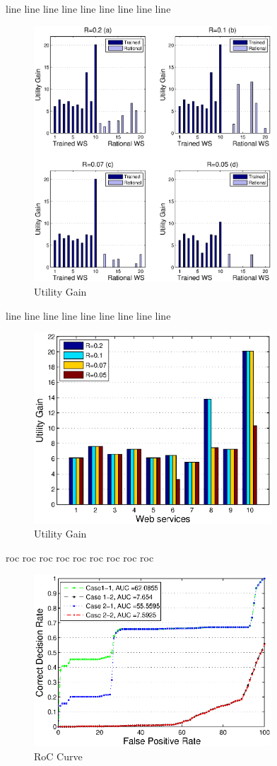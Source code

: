 \documentclass[10pt,journal,cspaper,compsoc]{IEEEtran}
\begin{document}
line line line
line line line
line line line

\begin{figure}%
\centering
\includegraphics[width=3.5in]{figures/utility_ratio.eps}
\caption{Utility Gain}
\label{utility_gain3}
\end{figure}

line line line
line line line
line line line

\begin{figure}%
\centering
\includegraphics[width=3.5in]{figures/utility_ratio_r.eps}
\caption{Utility Gain}
\label{utility_gain4}
\end{figure}

roc roc roc
roc roc roc
roc roc roc

\begin{figure}%
\centering
\includegraphics[width=3.5in]{figures/roc.eps}
\caption{RoC Curve}
\label{roc5}
\end{figure}
\end{document}
